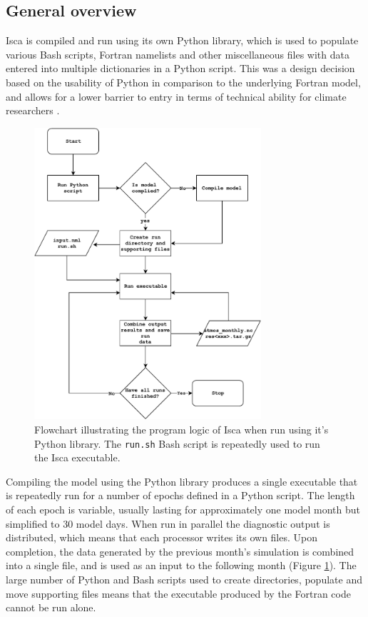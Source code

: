 \documentclass[a4paper,11pt]{report}
\begin{document}
\subsection{General overview}
Isca is compiled and run using its own Python library, which is used to populate various Bash scripts, Fortran namelists and other miscellaneous files with data entered into multiple dictionaries in a Python script. This was a design decision based on the usability of Python in comparison to the underlying Fortran model, and allows for a lower barrier to entry in terms of technical ability for climate researchers \cite{vallis2018isca}. 
\par
\begin{figure}[H]
\begin{center}
\includegraphics[width=0.75\textwidth]{img/isca_flow.pdf}
\caption[Flowchart of the program logic of Isca]{Flowchart illustrating the program logic of Isca when run using it's Python library. The \texttt{run.sh} Bash script is repeatedly used to run the Isca executable.}
\label{fig:flowchart}
\end{center}
\end{figure}
\par
Compiling the model using the Python library produces a single executable that is repeatedly run for a number of epochs defined in a Python script. The length of each epoch is variable, usually lasting for approximately one model month but simplified to 30 model days. When run in parallel the diagnostic output is distributed, which means that each processor writes its own files. Upon completion, the data generated by the previous month's simulation is combined into a single file, and is used as an input to the following month (Figure \ref{fig:flowchart}). The large number of Python and Bash scripts used to create directories, populate and move supporting files means that the executable produced by the Fortran code cannot be run alone.
\end{document}
